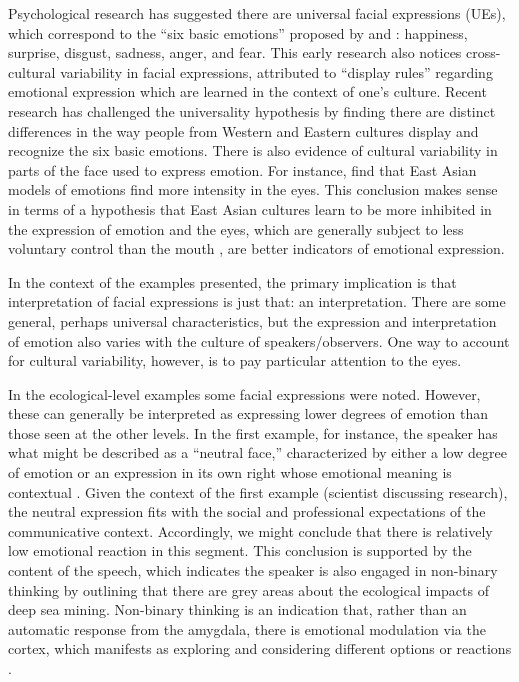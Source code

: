 Psychological research has suggested there are universal facial expressions (UEs), which correspond to the ``six basic emotions'' proposed by \cite{Ekman1971} and \cite{Ekman1972}: happiness, surprise, disgust, sadness, anger, and fear. This early research also notices cross-cultural variability in facial expressions, attributed to ``display rules'' regarding emotional expression which are learned in the context of one's culture. Recent research has challenged the universality hypothesis by finding there are distinct differences in the way people from Western and Eastern cultures display and recognize the six basic emotions. There is also evidence of cultural variability in parts of the face used to express emotion. For instance, \cite{Jack2012} find that East Asian models of emotions find more intensity in the eyes. This conclusion makes sense in terms of a hypothesis that East Asian cultures learn to be more inhibited in the expression of emotion and the eyes, which are generally subject to less voluntary control than the mouth \citep{Mai2011}, are better indicators of emotional expression.

In the context of the examples presented, the primary implication is that interpretation of facial expressions is just that: an interpretation. There are some general, perhaps universal characteristics, but the expression and interpretation of emotion also varies with the culture of speakers/observers. One way to account for cultural variability, however, is to pay particular attention to the eyes.

In the ecological-level examples some facial expressions were noted. However, these can generally be interpreted as expressing lower degrees of emotion than those seen at the other levels. In the first example, for instance, the speaker has what might be described as a ``neutral face,'' characterized by either a low degree of emotion or an expression in its own right whose emotional meaning is contextual \citep{Carrera-Levillain1994}. Given the context of the first example (scientist discussing research), the neutral expression fits with the social and professional expectations of the communicative context. Accordingly, we might conclude that there is relatively low emotional reaction in this segment. This conclusion is supported by the content of the speech, which indicates the speaker is also engaged in non-binary thinking by outlining that there are grey areas about the ecological impacts of deep sea mining. Non-binary thinking is an indication that, rather than an automatic response from the amygdala, there is emotional modulation via the cortex, which manifests as exploring and considering different options or reactions \citep{Wood2005}.    

